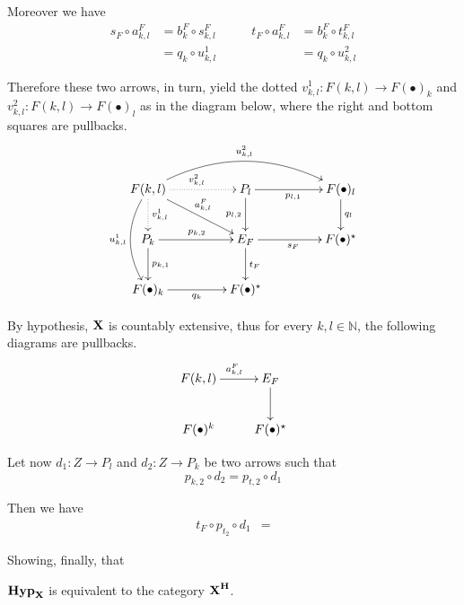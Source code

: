 \documentclass[runningheads,envcountsect]{lipics-v2021}
\def\X{\textbf {\textup{X}}}
\newcommand{\catname}[1]{\textbf{\textup{#1}}}
\newcommand{\hyp}{\catname{Hyp}}
\begin{document}
\begin{remark}
	Moreover we have
	\[\begin{split}
		s_F\circ a^F_{k,l}&=b^F_k\circ s^{F}_{k,l}\\&=
		q_{k}\circ u^1_{k,l}	\end{split} \qquad \begin{split}
		t_F\circ a^F_{k,l}&=b^F_k\circ t^{F}_{k,l}\\&=
		q_{k}\circ u^2_{k,l}	\end{split}  \]	
		
	Therefore these two arrows, in turn, yield the dotted $v^1_{k,l}\colon F(k,l)\to F(\bullet)_k $ and $v^2_{k,l}\colon F(k,l)\to F(\bullet)_l$ as in the diagram below, where the right and bottom squares are pullbacks.
	\[\xymatrix@C=45pt{F(k,l)  \ar[dr]^{a^F_{k,l}} \ar@{.>}[r]^{v^2_{k,l}} \ar@{.>}[d]^{v^1_{k,l}} \ar@/^.8cm/[rr]^{u^2_{k,l}} \ar@/_.5cm/[dd]_{u^1_{k,l}}& P_{l} \ar[r]_{p_{l,1}} \ar[d]_{p_{l,2}}& F(\bullet)_{l} \ar[d]^{q_{l}}\\ P_k \ar[r]^{p_{k,2}} \ar[d]^{p_{k,1}}& E_F \ar[r]_{s_F}  \ar[d]^{t_F}& F(\bullet)^\star \\ F(\bullet)_k  \ar[r]_{q_{k}}& F(\bullet)^\star}\]
	
 By hypothesis, $\X$ is countably extensive, thus for every $k, l\in \mathbb{N}$, the following diagrams are pullbacks.
 \[\xymatrix{F(k,l) \ar[r]^{a^F_{k,l}} & E_F \ar[d]^{}\\ 
 F(\bullet)^k& F(\bullet)^\star}\]
 
 
 Let now $d_1\colon Z\to P_l$ and $d_2\colon Z\to P_k $ be two arrows such that
 \[p_{k,2}\circ d_2=p_{t,2}\circ d_1\]
 
 Then we have
 \begin{align*}
 t_{F}\circ 	p_{t_2}\circ d_1&= \end{align*}
 
 
 Showing, finally, that
 
\end{remark}
\fi  


\begin{proposition}
	$\hyp_\X$ is equivalent to the category $\catname{\X}^{\catname{H}}$.
\end{proposition}
\end{document}
